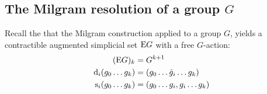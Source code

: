 \subsection{The Milgram resolution of a group \texorpdfstring{$G$}{G}}

Recall the that the Milgram construction applied to a group $G$, yields a contractible augmented simplicial set $\mathrm{E}G$ with a free $G$-action:
\begin{align*}
	(\mathrm{E}G)_k &= G^{k+1}\\
	\operatorname{d}_i(g_0\ldots g_k) &= (g_0\ldots\hat{g}_i\ldots g_k) \\
	\operatorname{s}_i(g_0\ldots g_k) &= (g_0\ldots g_i,g_i\ldots g_k)
\end{align*}
